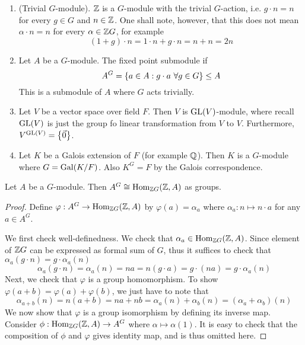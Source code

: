 \medskip

\begin{ex}
    \hfill

    \begin{enumerate}
        \item (Trivial $G$-module). ${\mathbb Z}$ is a $G$-module with the trivial $G$-action, i.e. $g\cdot n = n$ for every $g\in G$ and $n\in {\mathbb Z}$. One shall note, however, that this does not mean $\alpha\cdot n = n$ for every $\alpha \in {\mathbb Z} G$, for example
        \[(1+g)\cdot n = 1\cdot n + g\cdot n = n+n = 2n\]
        \item Let $A$ be a $G$-module. The fixed point submodule if 
        \[A^G = \left\{a\in A : g\cdot a\ \forall g\in G\right\}\leq A\]
        This is a submodule of $A$ where $G$ acts trivially.
        \item Let $V$ be a vector space over field $F$. Then $V$ is $\operatorname{GL}(V)$-module, where recall $\operatorname{GL}(V)$ is just the group fo linear transformation from $V$ to $V$. Furthermore, $V^{\operatorname{GL}(V)}= \left\{\vec 0\right\}$.
        \item Let $K$ be a Galois extension of $F$ (for example ${\mathbb Q}$). Then $K$ is a $G$-module where $G = \operatorname{Gal}(K/F)$. Also $K^G = F$ by the Galois correspondence.
    \end{enumerate}
\end{ex}

\medskip

\begin{lem}
    Let $A$ be a $G$-module. Then $A^G \cong \operatorname{Hom}_{{\mathbb Z} G}({\mathbb Z},A)$ as groups.
\end{lem}
\begin{proof}
    Define $\varphi: A^G \to \operatorname{Hom}_{{\mathbb Z} G}({\mathbb Z}, A)$ by $\varphi(a)= \alpha_a$ where $\alpha_a: n \mapsto n\cdot a$ for any $a\in A^G$.

    We first check well-definedness. We check that $\alpha_a \in \operatorname{Hom}_{{\mathbb Z} G}({\mathbb Z},A)$. Since element of ${\mathbb Z} G$ can be expressed as formal sum of $G$, thus it suffices to check that $\alpha_a(g\cdot n) = g\cdot \alpha_a(n)$ 
    \[\alpha_a(g\cdot n) = \alpha_a(n) = na = n(g \cdot a) = g\cdot (na) = g\cdot \alpha_a(n)\]
    Next, we check that $\varphi$ is a group homomorphism. To show $\varphi(a+b)= \varphi(a) + \varphi(b)$, we just have to note that 
    \[\alpha_{a+b}(n) = n(a+b) = na + nb = \alpha_a(n) + \alpha_b(n) = (\alpha_a + \alpha_b)(n)\]
    We now show that $\varphi$ is a group isomorphism by defining its inverse map. Consider $\phi:\operatorname{Hom}_{{\mathbb Z} G}({\mathbb Z}, A) \to A^G$ where $\alpha\mapsto \alpha(1)$. It is easy to check that the composition of $\phi$ and $\varphi$ gives identity map, and is thus omitted here.
\end{proof}

